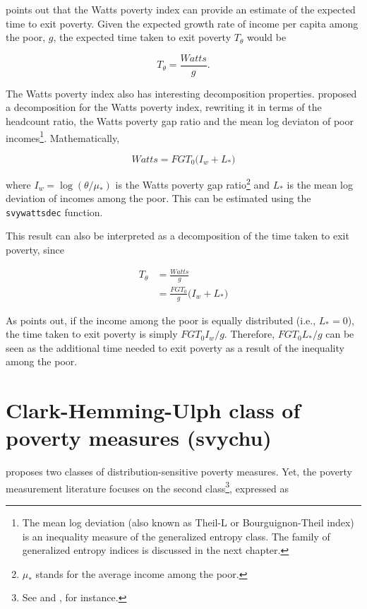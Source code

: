 \documentclass[]{book}
\begin{document}
\citet{murdoch1998} points out that the Watts poverty index can provide an estimate of the expected time to exit poverty. Given the expected growth rate of income per capita among the poor, \(g\), the expected time taken to exit poverty \(T_\theta\) would be

\[
T_\theta = \frac{Watts}{g}.
\]

The Watts poverty index also has interesting decomposition properties. \citet{blackburn1989} proposed a decomposition for the Watts poverty index, rewriting it in terms of the headcount ratio, the Watts poverty gap ratio and the mean log deviaton of poor incomes\footnote{The mean log deviation (also known as Theil-L or Bourguignon-Theil index) is an inequality measure of the generalized entropy class. The family of generalized entropy indices is discussed in the next chapter.}. Mathematically,

\[
Watts = FGT_0 \big( I_w + L_* \big)
\]

where \(I_w = \log(\theta/\mu_*)\) is the Watts poverty gap ratio\footnote{\(\mu_*\) stands for the average income among the poor.} and \(L_*\) is the mean log deviation of incomes among the poor. This can be estimated using the \texttt{svywattsdec} function.

This result can also be interpreted as a decomposition of the time taken to exit poverty, since

\[
\begin{aligned}
T_\theta &= \frac{Watts}{g} \\ 
&= \frac{FGT_0}{g} \big( I_w + L_* \big)
\end{aligned}
\]

As \citet{murdoch1998} points out, if the income among the poor is equally distributed (i.e., \(L_*=0\)), the time taken to exit poverty is simply \(FGT_0 I_w / g\). Therefore, \(FGT_0 L_* / g\) can be seen as the additional time needed to exit poverty as a result of the inequality among the poor.

\hypertarget{clark-hemming-ulph-class-of-poverty-measures-svychu}{%
\section{Clark-Hemming-Ulph class of poverty measures (svychu)}\label{clark-hemming-ulph-class-of-poverty-measures-svychu}}

\citet{clark1981} proposes two classes of distribution-sensitive poverty measures. Yet, the poverty measurement literature focuses on the second class\footnote{See \citet{atkinson1987} and \citet{verma2011}, for instance.}, expressed as
\end{document}
